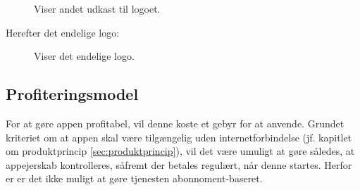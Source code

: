 \begin{figure}[H]
    \centering
    \caption{Viser andet udkast til logoet.}
\end{figure}

Herefter det endelige logo:
\begin{figure}[H]
    \centering
    \caption{Viser det endelige logo.}
\end{figure}

\subsection{Profiteringsmodel \label{sec:profiteringsmodel}}

For at gøre appen profitabel, vil denne koste et gebyr for at anvende. Grundet kriteriet om at appen skal være tilgængelig uden internetforbindelse (jf. kapitlet om produktprincip \ref{sec:produktprincip}), vil det være umuligt at gøre således, at appejerskab kontrolleres, såfremt der betales regulært, når denne startes. Herfor er er det ikke muligt at gøre tjenesten abonnoment-baseret.

